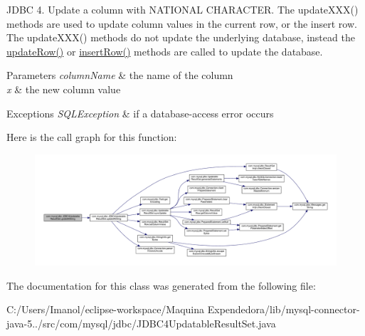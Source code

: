 J\+D\+BC 4. Update a column with N\+A\+T\+I\+O\+N\+AL C\+H\+A\+R\+A\+C\+T\+ER. The update\+X\+X\+X() methods are used to update column values in the current row, or the insert row. The update\+X\+X\+X() methods do not update the underlying database, instead the \mbox{\hyperlink{classcom_1_1mysql_1_1jdbc_1_1_updatable_result_set_a919969ba4b3c7cbc7b18605e9f31a746}{update\+Row()}} or \mbox{\hyperlink{classcom_1_1mysql_1_1jdbc_1_1_updatable_result_set_aef041f8d9d0778083716fc26652648fa}{insert\+Row()}} methods are called to update the database.


\begin{DoxyParams}{Parameters}
{\em column\+Name} & the name of the column \\
\hline
{\em x} & the new column value\\
\hline
\end{DoxyParams}

\begin{DoxyExceptions}{Exceptions}
{\em S\+Q\+L\+Exception} & if a database-\/access error occurs \\
\hline
\end{DoxyExceptions}
Here is the call graph for this function\+:
\nopagebreak
\begin{figure}[H]
\begin{center}
\leavevmode
\includegraphics[width=350pt]{classcom_1_1mysql_1_1jdbc_1_1_j_d_b_c4_updatable_result_set_ab67b1ef75d44720f30b8b976b73d6ec5_cgraph}
\end{center}
\end{figure}


The documentation for this class was generated from the following file\+:\begin{DoxyCompactItemize}
\item 
C\+:/\+Users/\+Imanol/eclipse-\/workspace/\+Maquina Expendedora/lib/mysql-\/connector-\/java-\/5../src/com/mysql/jdbc/J\+D\+B\+C4\+Updatable\+Result\+Set.\+java\end{DoxyCompactItemize}
